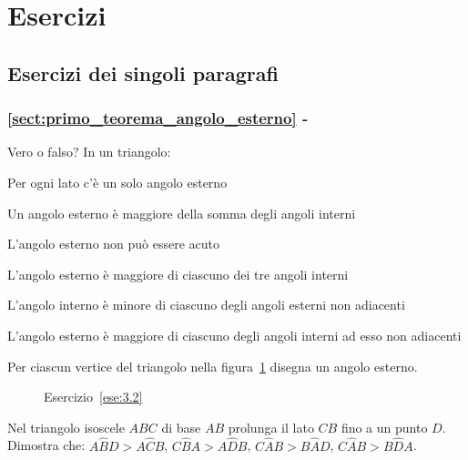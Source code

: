 
\section{Esercizi}

\subsection{Esercizi dei singoli paragrafi}

\begingroup
\hypersetup{linkcolor=black}
\subsubsection*{\ref{sect:primo_teorema_angolo_esterno} - }
\endgroup

\begin{esercizio}
\label{ese:3.1}
Vero o falso? In un triangolo:
\begin{enumeratea}
\item Per ogni lato c'è un solo angolo esterno\hfill\boxV\quad\boxF
\item Un angolo esterno è maggiore della somma degli angoli interni\hfill\boxV\quad\boxF
\item L'angolo esterno non può essere acuto\hfill\boxV\quad\boxF
\item L'angolo esterno è maggiore di ciascuno dei tre angoli interni\hfill\boxV\quad\boxF
\item L'angolo interno è minore di ciascuno degli angoli esterni non adiacenti\hfill\boxV\quad\boxF
\item L'angolo esterno è maggiore di ciascuno degli angoli interni ad esso non adiacenti\tab\tab\hfill\boxV\quad\boxF
\end{enumeratea}
\end{esercizio}

\begin{esercizio}
\label{ese:3.2}
Per ciascun vertice del triangolo nella figura~\ref{fig:ese3.2} disegna un angolo esterno.
\end{esercizio}

\begin{figure}[htb]
\centering
\caption{Esercizio~\ref{ese:3.2}}\label{fig:ese3.2}
\end{figure}

\begin{esercizio}
\label{ese:3.3}
Nel triangolo isoscele $ABC$ di base $AB$ prolunga il lato $CB$ fino a un punto $D$. Dimostra che: $A\widehat{B}D>A\widehat{C}B$, $C\widehat{B}A>A\widehat{D}B$, $C\widehat{A}B>B\widehat{A}D$, $C\widehat{A}B>B\widehat{D}A$.
\end{esercizio}

